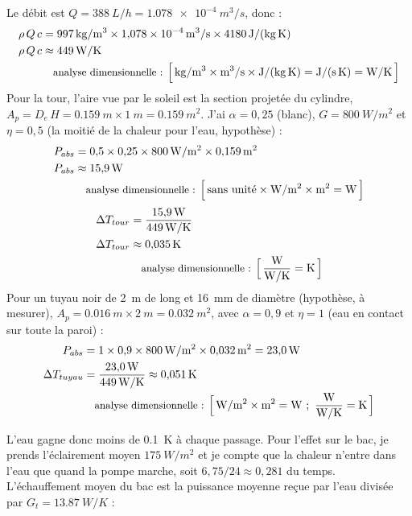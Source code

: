 \begin{demonstration}
Le débit est $Q = \qty{388}{L/h} = \qty{1,078e-4}{m^3/s}$, donc :
\begin{align*}
\rho\,Q\,c &= \qty{997}{kg/m^3} \times \qty{1,078e-4}{m^3/s} \times \qty{4180}{J/(kg\,K)}\\
\rho\,Q\,c &\approx \qty{449}{W/K}\\
\dimline{\unit{kg/m^3}\times\unit{m^3/s}\times\unit{J/(kg\,K)}=\unit{J/(s\,K)}=\unit{W/K}}
\end{align*}
Pour la tour, l'aire vue par le soleil est la section projetée du cylindre, $A_p = D_e\,H = \qty{0,159}{m} \times \qty{1}{m} = \qty{0,159}{m^2}$. J'ai $\alpha = 0{,}25$ (blanc), $G = \qty{800}{W/m^2}$ et $\eta = 0{,}5$ (la moitié de la chaleur pour l'eau, hypothèse) :
\begin{align*}
P_{abs} &= 0{,}5 \times 0{,}25 \times \qty{800}{W/m^2} \times \qty{0,159}{m^2}\\
P_{abs} &\approx \qty{15,9}{W}\\
\dimline{\text{sans unité}\times\unit{W/m^2}\times\unit{m^2}=\unit{W}}
\end{align*}
\begin{align*}
\Delta T_{tour} &= \frac{\qty{15,9}{W}}{\qty{449}{W/K}}\\
\Delta T_{tour} &\approx \qty{0,035}{K}\\
\dimline{\dfrac{\unit{W}}{\unit{W/K}}=\unit{K}}
\end{align*}
Pour un tuyau noir de \qty{2}{m} de long et \qty{16}{mm} de diamètre (hypothèse, à mesurer), $A_p = \qty{0,016}{m} \times \qty{2}{m} = \qty{0,032}{m^2}$, avec $\alpha = 0{,}9$ et $\eta = 1$ (eau en contact sur toute la paroi) :
\begin{align*}
P_{abs} &= 1 \times 0{,}9 \times \qty{800}{W/m^2} \times \qty{0,032}{m^2} = \qty{23,0}{W}\\
\Delta T_{tuyau} &= \frac{\qty{23,0}{W}}{\qty{449}{W/K}} \approx \qty{0,051}{K}\\
\dimline{\unit{W/m^2}\times\unit{m^2}=\unit{W}\ ;\ \dfrac{\unit{W}}{\unit{W/K}}=\unit{K}}
\end{align*}
\end{demonstration}

L'eau gagne donc moins de \qty{0,1}{K} à chaque passage. Pour l'effet sur le bac, je prends l'éclairement moyen $\qty{175}{W/m^2}$ et je compte que la chaleur n'entre dans l'eau que quand la pompe marche, soit $6{,}75/24 \approx 0{,}281$ du temps. L'échauffement moyen du bac est la puissance moyenne reçue par l'eau divisée par $G_t = \qty{13,87}{W/K}$ :

